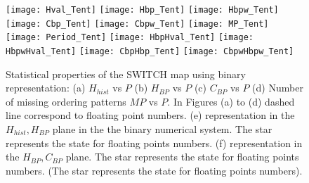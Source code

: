 \begin{figure}
	\texttt{[image: Hval\_Tent]}
	\texttt{[image: Hbp\_Tent]}
	\texttt{[image: Hbpw\_Tent]}
	\texttt{[image: Cbp\_Tent]}
	\texttt{[image: Cbpw\_Tent]}
	\texttt{[image: MP\_Tent]}
	\texttt{[image: Period\_Tent]}
	\texttt{[image: HbpHval\_Tent]}
	\texttt{[image: HbpwHval\_Tent]}
	\texttt{[image: CbpHbp\_Tent]}
	\texttt{[image: CbpwHbpw\_Tent]}
	\caption{Statistical properties of the SWITCH map using binary representation: (a) $H_{hist}$ vs $P$ (b) $H_{BP}$ vs $P$ (c) $C_{BP}$ vs $P$ (d) Number of missing ordering patterns $MP$ vs $P$. In Figures (a) to (d) dashed line correspond to floating point numbers. (e) representation in the $H_{hist},H_{BP}$ plane in the the binary numerical system.  The star represents the state for floating points numbers. (f) representation in the $H_{BP},C_{BP}$ plane.  The star represents the state for floating points numbers. (The star represents the state for floating points numbers). } \label{fig:seqbin}
\end{figure}
